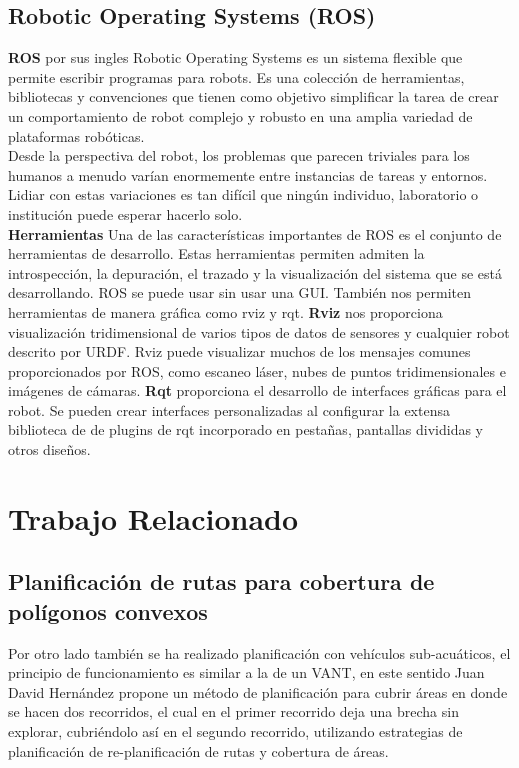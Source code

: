 \documentclass[]{report}
\begin{document}
\section{Robotic Operating Systems (ROS)}
\textbf{ROS} por sus ingles Robotic Operating Systems es un sistema flexible que permite escribir programas para robots. Es una colección de herramientas, bibliotecas y convenciones que tienen como objetivo simplificar  la tarea de crear un comportamiento de robot complejo y robusto en una amplia variedad de plataformas robóticas.\\
Desde la perspectiva del robot, los problemas que parecen triviales para los humanos a menudo varían enormemente entre instancias de tareas y entornos. Lidiar con estas variaciones es tan difícil que ningún individuo, laboratorio o institución puede esperar hacerlo solo.\\
\textbf{Herramientas} Una de las características importantes de ROS es el conjunto de herramientas de desarrollo. Estas herramientas permiten admiten la introspección, la depuración, el trazado y la visualización del sistema que se está desarrollando. ROS se puede usar sin usar una GUI. También nos permiten herramientas de manera gráfica como rviz y rqt.
\textbf{Rviz} nos proporciona visualización tridimensional de varios tipos de datos de sensores y cualquier robot descrito por URDF. Rviz puede visualizar muchos de los mensajes comunes proporcionados por ROS, como escaneo láser, nubes de puntos tridimensionales e imágenes de cámaras.
\textbf{Rqt} proporciona el desarrollo de interfaces gráficas para el robot. Se pueden crear interfaces personalizadas al configurar la extensa biblioteca de de plugins de rqt incorporado en pestañas, pantallas divididas y otros diseños.


  
\chapter{Trabajo Relacionado}

\section{Planificación de rutas para cobertura de polígonos convexos}



Por otro lado también se ha realizado planificación con vehículos sub-acuáticos, el principio de funcionamiento es similar a la de un VANT, en este sentido Juan David Hernández propone un método de planificación para cubrir áreas en donde se hacen dos recorridos, el cual en el primer recorrido deja una brecha sin explorar, cubriéndolo así en el segundo recorrido, utilizando estrategias de planificación de re-planificación de rutas y cobertura de áreas. \cite{hernandez2017}\\
\end{document}
